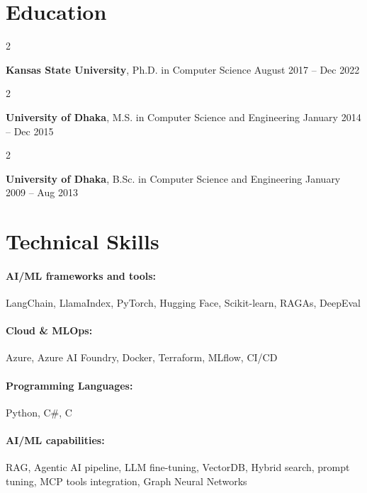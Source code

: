 \documentclass[10pt, letterpaper]{article}
\newenvironment{twocolentry}[2][]{
    \onecolentry
    \def\secondColumn{#2}
    \setcolumnwidth{\fill, 4.5 cm}
    \begin{paracol}{2}
}{
    \switchcolumn \raggedleft \secondColumn
    \end{paracol}
    \endonecolentry
} %
\begin{document}
\section{Education}

        \begin{twocolentry}{
            August 2017 -- Dec 2022
        }
            \textbf{Kansas State University}, Ph.D. in Computer Science\end{twocolentry}

        \begin{twocolentry}{
            January 2014 -- Dec 2015
        }
            \textbf{University of Dhaka}, M.S. in Computer Science and Engineering\end{twocolentry}

        \begin{twocolentry}{
            January 2009 -- Aug 2013
        }
            \textbf{University of Dhaka}, B.Sc. in Computer Science and Engineering\end{twocolentry}

\vspace{-1mm}
\section{Technical Skills}

        \paragraph{AI/ML frameworks and tools:} LangChain, LlamaIndex, PyTorch, Hugging Face, Scikit-learn, RAGAs, DeepEval
        \vspace{-4mm}
        \paragraph{Cloud \& MLOps:} Azure, Azure AI Foundry, Docker, Terraform, MLflow, CI/CD
        \vspace{-4mm}
        \paragraph{Programming Languages:} Python, C\#, C
        \vspace{-4mm}
        \paragraph{AI/ML capabilities:} RAG, Agentic AI pipeline, LLM fine-tuning, VectorDB, Hybrid search, prompt tuning, MCP tools integration, Graph Neural Networks
\end{document}
